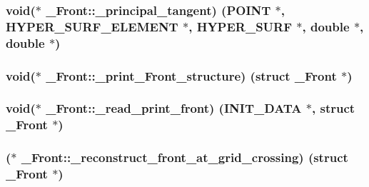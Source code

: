 \subsubsection[{\texorpdfstring{\+\_\+principal\+\_\+tangent}{_principal_tangent}}]{\setlength{\rightskip}{0pt plus 5cm}void($\ast$ \+\_\+\+Front\+::\+\_\+principal\+\_\+tangent) ({\bf P\+O\+I\+NT} $\ast$, {\bf H\+Y\+P\+E\+R\+\_\+\+S\+U\+R\+F\+\_\+\+E\+L\+E\+M\+E\+NT} $\ast$, {\bf H\+Y\+P\+E\+R\+\_\+\+S\+U\+RF} $\ast$, double $\ast$, double $\ast$)}\hypertarget{struct___front_a7ed50ad2f247eb749c567b421aeb737e}{}\label{struct___front_a7ed50ad2f247eb749c567b421aeb737e}
\subsubsection[{\texorpdfstring{\+\_\+print\+\_\+\+Front\+\_\+structure}{_print_Front_structure}}]{\setlength{\rightskip}{0pt plus 5cm}void($\ast$ \+\_\+\+Front\+::\+\_\+print\+\_\+\+Front\+\_\+structure) (struct {\bf \+\_\+\+Front} $\ast$)}\hypertarget{struct___front_a47039f1d51da85eed8b9183bfd995415}{}\label{struct___front_a47039f1d51da85eed8b9183bfd995415}
\subsubsection[{\texorpdfstring{\+\_\+read\+\_\+print\+\_\+front}{_read_print_front}}]{\setlength{\rightskip}{0pt plus 5cm}void($\ast$ \+\_\+\+Front\+::\+\_\+read\+\_\+print\+\_\+front) ({\bf I\+N\+I\+T\+\_\+\+D\+A\+TA} $\ast$, struct {\bf \+\_\+\+Front} $\ast$)}\hypertarget{struct___front_a8af4c0d3c3b284bc90fb5ccee2367f34}{}\label{struct___front_a8af4c0d3c3b284bc90fb5ccee2367f34}
\subsubsection[{\texorpdfstring{\+\_\+reconstruct\+\_\+front\+\_\+at\+\_\+grid\+\_\+crossing}{_reconstruct_front_at_grid_crossing}}]{($\ast$ \+\_\+\+Front\+::\+\_\+reconstruct\+\_\+front\+\_\+at\+\_\+grid\+\_\+crossing) (struct {\bf \+\_\+\+Front} $\ast$)}\hypertarget{struct___front_a999d7f1b6956921b4b3ff164dea01d87}{}\label{struct___front_a999d7f1b6956921b4b3ff164dea01d87}
